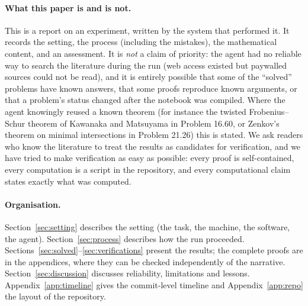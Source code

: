 \paragraph{What this paper is and is not.}
This is a report on an experiment, written by the system that performed it. It records the setting, the process
(including the mistakes), the mathematical content, and an assessment. It is \emph{not} a claim of priority: the
agent had no reliable way to search the literature during the run (web access existed but paywalled sources could
not be read), and it is entirely possible that some of the ``solved'' problems have known answers, that some proofs
reproduce known arguments, or that a problem's status changed after the notebook was compiled. Where the agent
knowingly reused a known theorem (for instance the twisted Frobenius--Schur theorem of Kawanaka and Matsuyama
in Problem 16.60, or Zenkov's theorem on minimal intersections in Problem 21.26) this is stated. We ask readers who
know the literature to treat the results as candidates for verification, and we have tried to make verification as
easy as possible: every proof is self-contained, every computation is a script in the repository, and every
computational claim states exactly what was computed.

\paragraph{Organisation.}
Section~\ref{sec:setting} describes the setting (the task, the machine, the software, the agent).
Section~\ref{sec:process} describes how the run proceeded. Sections~\ref{sec:solved}--\ref{sec:verifications}
present the results; the complete proofs are in the appendices, where they can be checked independently of the
narrative. Section~\ref{sec:discussion} discusses reliability, limitations and lessons. Appendix~\ref{app:timeline}
gives the commit-level timeline and Appendix~\ref{app:repo} the layout of the repository.
